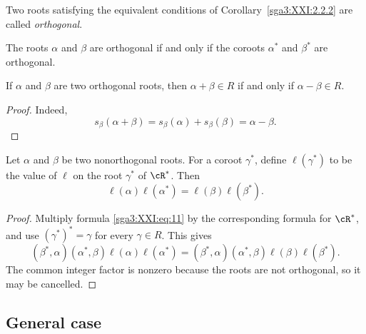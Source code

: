 \begin{definition}\label{sga3:XXI:2.2.3}
Two roots satisfying the equivalent conditions of
Corollary~\ref{sga3:XXI:2.2.2} are called \emph{orthogonal}.
\end{definition}


\begin{remark}\label{sga3:XXI:2.2.4}
The roots \(\alpha\) and \(\beta\) are orthogonal if and only if the
coroots \(\alpha^\ast\) and \(\beta^\ast\) are orthogonal.
\end{remark}

\begin{lemma}\label{sga3:XXI:2.2.5}
If \(\alpha\) and \(\beta\) are two orthogonal roots, then
\(\alpha+\beta\in R\) if and only if \(\alpha-\beta\in R\).
\end{lemma}

\begin{proof}
Indeed,
\[
 s_\beta(\alpha+\beta)
 =s_\beta(\alpha)+s_\beta(\beta)=\alpha-\beta.
\]
\end{proof}

\begin{lemma}\label{sga3:XXI:2.2.6}
Let \(\alpha\) and \(\beta\) be two nonorthogonal roots. For a coroot
\(\gamma^\ast\), define \(\ell(\gamma^\ast)\) to be the value of
\(\ell\) on the root \(\gamma^\ast\) of \(\cR^\ast\). Then
\begin{equation}
 \ell(\alpha)\ell(\alpha^\ast)
 =\ell(\beta)\ell(\beta^\ast).
 \tag{12}\label{sga3:XXI:eq:12}
\end{equation}
\end{lemma}

\begin{proof}
Multiply formula \eqref{sga3:XXI:eq:11} by the corresponding formula
for \(\cR^\ast\), and use
\((\gamma^\ast)^\ast=\gamma\) for every \(\gamma\in R\). This gives
\[
 (\beta^\ast,\alpha)(\alpha^\ast,\beta)
 \ell(\alpha)\ell(\alpha^\ast)
 =
 (\beta^\ast,\alpha)(\alpha^\ast,\beta)
 \ell(\beta)\ell(\beta^\ast).
\]
The common integer factor is nonzero because the roots are not
orthogonal, so it may be cancelled.
\end{proof}

\subsection{General case}

